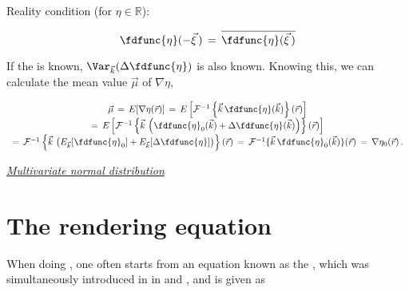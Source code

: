 {\HRule

Reality condition (for $\eta\in\mathbb{R}$):

\begin{equation}
\fdfunc{\eta}(-\vec{\xi}\,) \,=\, \overline{\fdfunc{\eta}(\vec{\xi}\,)}
\end{equation}

\HRule

If the  is known, $\Var_{\vec{k}}(\Delta\fdfunc{\eta})$ is also known. Knowing this, we can calculate the mean value $\vec{\mu}$ of $\nabla\eta$,

\begin{equation}
\begin{array}{c}
\vec{\mu} \,=\, E[\nabla\eta(\vec{r})] \,=\, E\left[\mathcal{F}^{-1}\left\{\vec{k}\,\fdfunc{\eta}(\vec{k})\right\}(\vec{r})\right] \\
=\, E\left[\mathcal{F}^{-1}\left\{\vec{k}\,\left(\fdfunc{\eta}_0(\vec{k})+\Delta\fdfunc{\eta}(\vec{k})\right)\right\}(\vec{r})\right] \\
=\, \mathcal{F}^{-1}\left\{\vec{k}\,\left(E_{\vec{k}}[\fdfunc{\eta}_0]+E_{\vec{k}}[\Delta\fdfunc{\eta}]\right)\right\}(\vec{r}) \,=\, \mathcal{F}^{-1}\{\vec{k}\,\fdfunc{\eta}_0(\vec{k})\}(\vec{r}) \,=\, \nabla\eta_0(\vec{r})\,.
\end{array}
\end{equation}

\textit{\href{http://en.wikipedia.org/wiki/Multivariate\_normal\_distribution\#Non-degenerate\_case}{Multivariate normal distribution}}

\HRule





















\section{The rendering equation}

When doing , one often starts from an equation known as the , which was simultaneously introduced in  in \citep{temp} and \citep{temp}, and is given as

}

